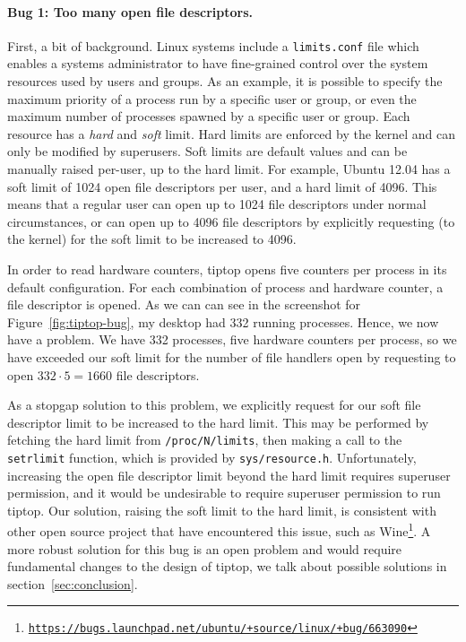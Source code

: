 \paragraph{Bug 1: Too many open file descriptors.}
First, a bit of background. Linux systems include a \texttt{limits.conf} file which enables a systems administrator to have fine-grained control over the system resources used by users and groups.
As an example, it is possible to specify the maximum priority of a process run by a specific user or group, or even the maximum number of processes spawned by a specific user or group. Each resource has a \emph{hard} and \emph{soft} limit. Hard limits are enforced by the kernel and can only be modified by superusers. Soft limits are default values and can be manually raised per-user, up to the hard limit.
For example, Ubuntu 12.04 has a soft limit of 1024 open file descriptors per user, and a hard limit of 4096.
This means that a regular user can open up to 1024 file descriptors under normal circumstances, or can open up to 4096 file descriptors by explicitly requesting (to the kernel) for the soft limit to be increased to 4096.

In order to read hardware counters, tiptop opens five counters per process in its default configuration.
For each combination of process and hardware counter, a file descriptor is opened.
As we can can see in the screenshot for Figure~\ref{fig:tiptop-bug}, my desktop had 332 running processes.
Hence, we now have a problem.
We have 332 processes, five hardware counters per process, so we have exceeded our soft limit for the number of file handlers open by requesting to open $332\cdot 5 = 1660$ file descriptors.

As a stopgap solution to this problem, we explicitly request for our soft file descriptor limit to be increased to the hard limit. This may be performed by fetching the hard limit from \texttt{/proc/N/limits}, then making a call to the \texttt{setrlimit} function, which is provided by \texttt{sys/resource.h}.
Unfortunately, increasing the open file descriptor limit beyond the hard limit requires superuser permission,
and it would be undesirable to require superuser permission to run tiptop.
Our solution, raising the soft limit to the hard limit, is consistent with other open source project that have encountered this issue, such as Wine\footnote{\texttt{\url{https://bugs.launchpad.net/ubuntu/+source/linux/+bug/663090}}}.
A more robust solution for this bug is an open problem and would require fundamental changes to the design of tiptop, we talk about possible solutions in section~\ref{sec:conclusion}.

